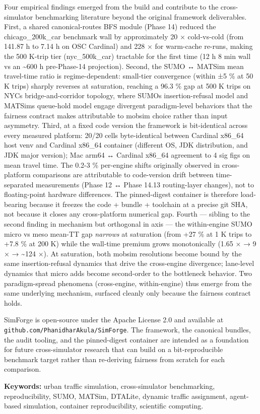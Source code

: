 Four empirical findings emerged from the build and contribute to the
cross-simulator benchmarking literature beyond the original framework
deliverables. First, a shared canonical-routes BFS module (Phase 14)
reduced the chicago\_200k\_car benchmark wall by approximately 20 ×
cold-vs-cold (from 141.87 h to 7.14 h on OSC Cardinal) and 228 × for
warm-cache re-runs, making the 500 K-trip tier (nyc\_500k\_car)
tractable for the first time (12 h 8 min wall vs an \textasciitilde600 h
pre-Phase-14 projection). Second, the SUMO ↔ MATSim mean travel-time
ratio is regime-dependent: small-tier convergence (within ±5 \% at 50 K
trips) sharply reverses at saturation, reaching a 96.3 \% gap at 500 K
trips on NYC\textquotesingle s bridge-and-corridor topology, where
SUMO\textquotesingle s insertion-refusal model and
MATSim\textquotesingle s queue-hold model engage divergent
paradigm-level behaviors that the fairness contract makes attributable
to mobsim choice rather than input asymmetry. Third, at a fixed code
version the framework is bit-identical across every measured platform:
20/20 cells byte-identical between Cardinal x86\_64 host venv and
Cardinal x86\_64 container (different OS, JDK distribution, and JDK
major version); Mac arm64 ↔ Cardinal x86\_64 agreement to 4 sig figs on
mean travel time. The 0.2-3 \% per-engine shifts originally observed in
cross-platform comparisons are attributable to code-version drift
between time-separated measurements (Phase 12 ↔ Phase 14.13
routing-layer changes), not to floating-point hardware differences. The
pinned-digest container is therefore load-bearing because it freezes the
code + bundle + toolchain at a precise git SHA, not because it closes
any cross-platform numerical gap. Fourth --- sibling to the second
finding in mechanism but orthogonal in axis --- the within-engine SUMO
micro vs meso mean-TT gap \emph{narrows} at saturation (from +27 \% at 1
K trips to +7.8 \% at 200 K) while the wall-time premium grows
monotonically (1.65 × → 9 × → \textasciitilde124 ×). At saturation, both
mobsim resolutions become bound by the same insertion-refusal dynamics
that drive the cross-engine divergence; lane-level dynamics that micro
adds become second-order to the bottleneck behavior. Two paradigm-spread
phenomena (cross-engine, within-engine) thus emerge from the same
underlying mechanism, surfaced cleanly only because the fairness
contract holds.

SimForge is open-source under the Apache License 2.0 and available at
\texttt{github.com/PhanidharAkula/SimForge}. The framework, the
canonical bundles, the audit tooling, and the pinned-digest container
are intended as a foundation for future cross-simulator research that
can build on a bit-reproducible benchmark target rather than re-deriving
fairness from scratch for each comparison.

\textbf{Keywords:} urban traffic simulation, cross-simulator
benchmarking, reproducibility, SUMO, MATSim, DTALite, dynamic traffic
assignment, agent-based simulation, container reproducibility,
scientific computing.
